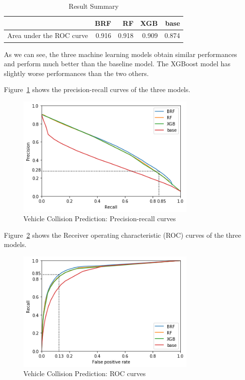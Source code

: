 \documentclass[conference]{IEEEtran}
\begin{document}
\begin{table}[htbp]
\caption{Result Summary}
\begin{center}
\begin{tabular}{|l|r|r|r|r|}
\cline{2-5}
\multicolumn{1}{c|}{}    &    BRF &    RF  &    XGB & base \\
\hline
Area under the ROC curve &  0.916 &  0.918 &  0.909 & 0.874 \\
\hline
\end{tabular}
\label{table:summary}
\end{center}
\end{table}
As we can see, the three machine learning models obtain similar performances
and perform much better than the baseline model. The XGBoost
model has slightly worse performances than the two others.

Figure~\ref{fig:precision-recall} shows the precision-recall curves of the three models.

\begin{figure}[htbp]
\centerline{\includegraphics[height=6cm, keepaspectratio]{Figures/pr.png}}
\caption{Vehicle Collision Prediction: Precision-recall curves}
\label{fig:precision-recall}
\end{figure}

Figure~\ref{fig:roc} shows the Receiver operating characteristic (ROC) curves of the three models.

\begin{figure}[htbp]
\centerline{\includegraphics[height=6cm, keepaspectratio]{Figures/roc.png}}
\caption{Vehicle Collision Prediction: ROC curves}
\label{fig:roc}
\end{figure}
\end{document}
